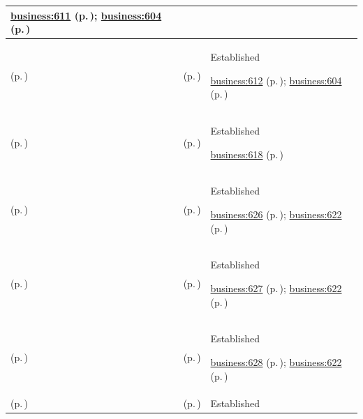 \begin{longtable}{|>{\raggedright\arraybackslash}p{0.27\TableWidth}|>{\raggedright\arraybackslash}p{0.27\TableWidth}|>{\raggedright\arraybackslash}p{0.46\TableWidth}|}
 \hyperref[rad:business:606]{business:611} (p.\,\pageref{rad:business:606}); \hyperref[rad:business:604]{business:604} (p.\,\pageref{rad:business:604})\\\hline
\nameref{cap:bc-population-health-surveillance} (p.\,\pageref{cap:bc-population-health-surveillance}) & \nameref{cap:bc-population-health-reporting} (p.\,\pageref{cap:bc-population-health-reporting}) & Established

 \hyperref[rad:business:606]{business:612} (p.\,\pageref{rad:business:606}); \hyperref[rad:business:604]{business:604} (p.\,\pageref{rad:business:604})\\\hline
\nameref{cap:bc-population-health-health-system-planning} (p.\,\pageref{cap:bc-population-health-health-system-planning}) & \nameref{cap:bc-health-system-planning} (p.\,\pageref{cap:bc-health-system-planning}) & Established

 \hyperref[rad:business:618]{business:618} (p.\,\pageref{rad:business:618})\\\hline
\nameref{cap:bc-health-system-planning} (p.\,\pageref{cap:bc-health-system-planning}) & \nameref{cap:bc-health-service-demand-assessment} (p.\,\pageref{cap:bc-health-service-demand-assessment}) & Established

 \hyperref[rad:business:624]{business:626} (p.\,\pageref{rad:business:624}); \hyperref[rad:business:622]{business:622} (p.\,\pageref{rad:business:622})\\\hline
\nameref{cap:bc-health-system-planning} (p.\,\pageref{cap:bc-health-system-planning}) & \nameref{cap:bc-health-service-capacity-planning} (p.\,\pageref{cap:bc-health-service-capacity-planning}) & Established

 \hyperref[rad:business:624]{business:627} (p.\,\pageref{rad:business:624}); \hyperref[rad:business:622]{business:622} (p.\,\pageref{rad:business:622})\\\hline
\nameref{cap:bc-health-system-planning} (p.\,\pageref{cap:bc-health-system-planning}) & \nameref{cap:bc-health-service-distribution-planning} (p.\,\pageref{cap:bc-health-service-distribution-planning}) & Established

 \hyperref[rad:business:624]{business:628} (p.\,\pageref{rad:business:624}); \hyperref[rad:business:622]{business:622} (p.\,\pageref{rad:business:622})\\\hline
\nameref{cap:bc-health-information-knowledge-management} (p.\,\pageref{cap:bc-health-information-knowledge-management}) & \nameref{cap:bc-health-information-management} (p.\,\pageref{cap:bc-health-information-management}) & Established


\end{longtable}
